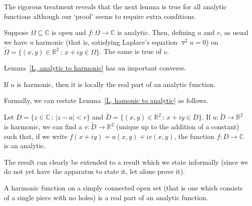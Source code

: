 The rigorous treatment reveals that the next lemma is
true for all analytic functions although our `proof'
seems to require extra conditions.
\begin{lemma}\label{L, analytic to harmonic} 
Suppose $\Omega\subseteq{\mathbb C}$ is open
and $f:\Omega\rightarrow{\mathbb C}$ is analytic. Then,
defining $u$ and $v$, as usual we have $u$ 
harmonic (that is, satisfying Laplace's equation
$\triangledown^{2}u=0$)
on $\tilde{\Omega}=\{(x,y)\in{\mathbb R}^{2}\,:\,x+iy\in\Omega\}$. 
The same is true of $v$.
\end{lemma}
Lemma~\ref{L, analytic to harmonic} has an important converse.
\begin{lemma}\label{L, hamonic to analytic}
If $u$ is harmonic, then it is locally 
the real part of an analytic function.
\end{lemma}
Formally, we can restate Lemma~\ref{L, hamonic to analytic}
as follows.
\begin{lemma} Let $D=\{z\in{\mathbb C}\,:\,|z-a|<r\}$
and $\tilde{D}=\{(x,y)\in{\mathbb R}^{2}\,:\,x+iy\in D\}$.
If $u:\tilde{D}\rightarrow{\mathbb R}^{2}$ is harmonic,
we can find a $v:\tilde{D}\rightarrow{\mathbb R}^{2}$
(unique up to the addition of a constant) such
that, if we write $f(x+iy)=u(x,y)+iv(x,y)$, the
function $f:D\rightarrow{\mathbb C}$ is an analytic.
\end{lemma}
The result can clearly be extended to a result which we state
informally (since we do not yet have the apparatus to state
it, let alone prove it).
\begin{lemma} A harmonic function on a simply connected
open set (that is one which consists of a single piece
with no holes) is a real part of an analytic function.
\end{lemma}

